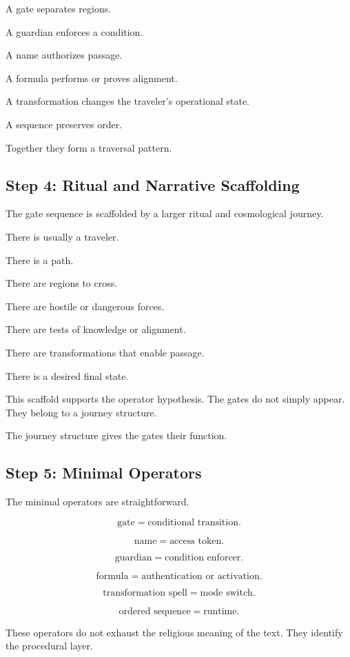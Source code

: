 \documentclass[11pt]{book}
\begin{document}
A gate separates regions.

A guardian enforces a condition.

A name authorizes passage.

A formula performs or proves alignment.

A transformation changes the traveler's operational state.

A sequence preserves order.

Together they form a traversal pattern.

\subsection{Step 4: Ritual and Narrative Scaffolding}

The gate sequence is scaffolded by a larger ritual and cosmological journey.

There is usually a traveler.

There is a path.

There are regions to cross.

There are hostile or dangerous forces.

There are tests of knowledge or alignment.

There are transformations that enable passage.

There is a desired final state.

This scaffold supports the operator hypothesis. The gates do not simply appear. They belong to a journey structure.

The journey structure gives the gates their function.

\subsection{Step 5: Minimal Operators}

The minimal operators are straightforward.

\[
\text{gate} = \text{conditional transition}.
\]

\[
\text{name} = \text{access token}.
\]

\[
\text{guardian} = \text{condition enforcer}.
\]

\[
\text{formula} = \text{authentication or activation}.
\]

\[
\text{transformation spell} = \text{mode switch}.
\]

\[
\text{ordered sequence} = \text{runtime}.
\]

These operators do not exhaust the religious meaning of the text. They identify the procedural layer.
\end{document}
